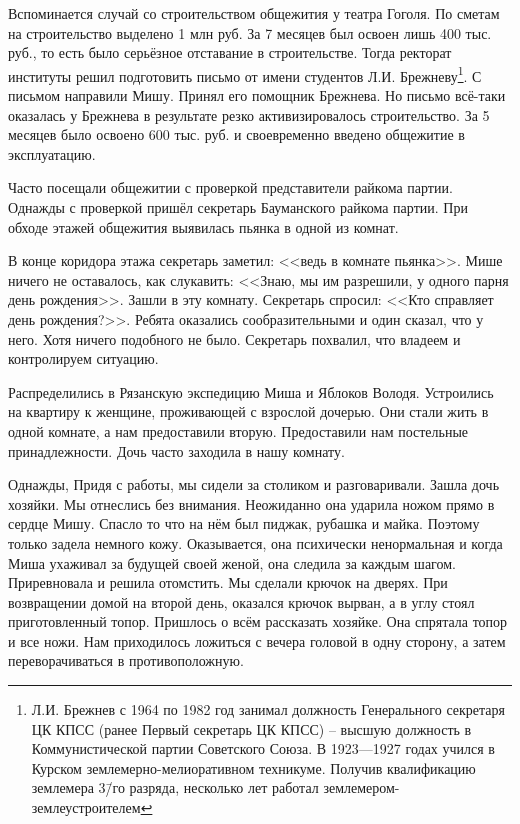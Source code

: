Вспоминается случай со строительством общежития у театра Гоголя. По сметам на строительство выделено 1 млн руб. За 7 месяцев был освоен лишь 400 тыс. руб., то есть было серьёзное отставание в строительстве. Тогда ректорат институты решил подготовить письмо от имени студентов Л.И. Брежневу\footnote{Л.И. Брежнев с 1964 по 1982 год занимал должность Генерального секретаря ЦК КПСС (ранее Первый секретарь ЦК КПСС) \--- высшую должность в Коммунистической партии Советского Союза. В 1923—1927 годах учился в Курском землемерно-мелиоративном техникуме. Получив квалификацию землемера 3\=/го разряда, несколько лет работал землемером-землеустроителем}. С письмом направили Мишу. Принял его помощник Брежнева. Но письмо всё-таки оказалась у Брежнева в результате резко активизировалось строительство. За 5 месяцев было освоено 600 тыс. руб. и своевременно введено общежитие в эксплуатацию.

Часто посещали общежитии с проверкой представители райкома партии. Однажды с проверкой пришёл секретарь Бауманского райкома партии. При обходе этажей общежития выявилась пьянка в одной из комнат. 

В конце коридора этажа секретарь заметил: <<ведь в комнате пьянка>>. Мише ничего не оставалось, как слукавить: <<Знаю, мы им разрешили, у одного парня день рождения>>. Зашли в эту комнату. Секретарь спросил: <<Кто справляет день рождения?>>. Ребята оказались сообразительными и один сказал, что у него. Хотя ничего подобного не было. Секретарь похвалил, что владеем и контролируем ситуацию.

Распределились в Рязанскую экспедицию Миша и Яблоков Володя. Устроились на квартиру к женщине, проживающей с взрослой дочерью. Они стали жить в одной комнате, а нам предоставили вторую. Предоставили нам постельные принадлежности. Дочь часто заходила в нашу комнату.

Однажды, Придя с работы, мы сидели за столиком и разговаривали. Зашла дочь хозяйки. Мы отнеслись без внимания. Неожиданно она ударила ножом прямо в сердце Мишу. Спасло то что на нём был пиджак, рубашка и майка. Поэтому только задела немного кожу. Оказывается, она психически ненормальная и когда Миша ухаживал за будущей своей женой, она следила за каждым шагом. Приревновала и решила отомстить. Мы сделали крючок на дверях. При возвращении домой на второй день, оказался крючок вырван, а в углу стоял приготовленный топор. Пришлось о всём рассказать хозяйке. Она спрятала топор и все ножи. Нам приходилось ложиться с вечера головой в одну сторону, а затем переворачиваться в противоположную.

